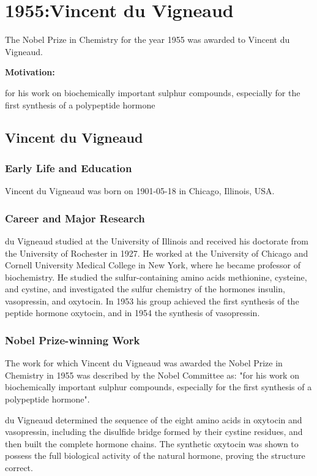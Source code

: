 \chapter{1955:Vincent du Vigneaud}

\label{chap:chemistry1955}

The Nobel Prize in Chemistry for the year 1955 was awarded to Vincent du Vigneaud.

\textbf{Motivation:}

for his work on biochemically important sulphur compounds, especially for the first synthesis of a polypeptide hormone

\section{Vincent du Vigneaud}

\subsection*{Early Life and Education}

Vincent du Vigneaud was born on 1901-05-18 in Chicago, Illinois, USA.

\subsection*{Career and Major Research}

du Vigneaud studied at the University of Illinois and received his doctorate from the University of Rochester in 1927. He worked at the University of Chicago and Cornell University Medical College in New York, where he became professor of biochemistry. He studied the sulfur-containing amino acids methionine, cysteine, and cystine, and investigated the sulfur chemistry of the hormones insulin, vasopressin, and oxytocin. In 1953 his group achieved the first synthesis of the peptide hormone oxytocin, and in 1954 the synthesis of vasopressin.

\subsection*{Nobel Prize-winning Work}

The work for which Vincent du Vigneaud was awarded the Nobel Prize in Chemistry in 1955 was described by the Nobel Committee as: "for his work on biochemically important sulphur compounds, especially for the first synthesis of a polypeptide hormone".

du Vigneaud determined the sequence of the eight amino acids in oxytocin and vasopressin, including the disulfide bridge formed by their cystine residues, and then built the complete hormone chains. The synthetic oxytocin was shown to possess the full biological activity of the natural hormone, proving the structure correct.

